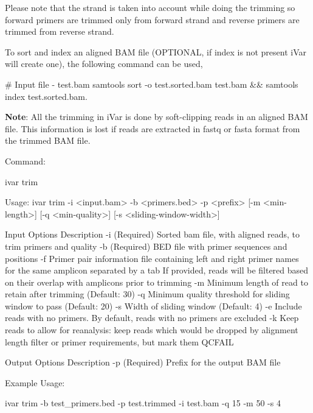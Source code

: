 Please note that the strand is taken into account while doing the trimming so forward primers are trimmed only from forward strand and reverse primers are trimmed from reverse strand.

To sort and index an aligned B\+AM file (O\+P\+T\+I\+O\+N\+AL, if index is not present i\+Var will create one), the following command can be used,


\begin{DoxyCode}
# Input file - test.bam
samtools sort -o test.sorted.bam test.bam && samtools index test.sorted.bam.
\end{DoxyCode}


{\bfseries Note}\+: All the trimming in i\+Var is done by soft-\/clipping reads in an aligned B\+AM file. This information is lost if reads are extracted in fastq or fasta format from the trimmed B\+AM file.

Command\+: 
\begin{DoxyCode}
ivar trim

Usage: ivar trim -i <input.bam> -b <primers.bed> -p <prefix> [-m <min-length>] [-q <min-quality>] [-s
       <sliding-window-width>]

Input Options    Description
           -i    (Required) Sorted bam file, with aligned reads, to trim primers and quality
           -b    (Required) BED file with primer sequences and positions
           -f    Primer pair information file containing left and right primer names for the same amplicon
       separated by a tab
                 If provided, reads will be filtered based on their overlap with amplicons prior to
       trimming
           -m    Minimum length of read to retain after trimming (Default: 30)
           -q    Minimum quality threshold for sliding window to pass (Default: 20)
           -s    Width of sliding window (Default: 4)
           -e    Include reads with no primers. By default, reads with no primers are excluded
           -k    Keep reads to allow for reanalysis: keep reads which would be dropped by
                 alignment length filter or primer requirements, but mark them QCFAIL

Output Options   Description
           -p    (Required) Prefix for the output BAM file
\end{DoxyCode}


Example Usage\+: 
\begin{DoxyCode}
ivar trim -b test\_primers.bed -p test.trimmed -i test.bam -q 15 -m 50 -s 4
\end{DoxyCode}


